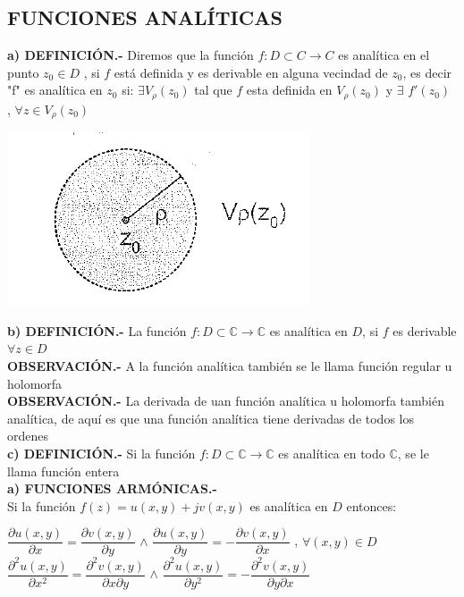 \documentclass[10pt,a4paper]{book}
\begin{document}
\subsection{FUNCIONES ANALÍTICAS}
\textbf{a) DEFINICIÓN.- } Diremos que la función $f: D\subset C \rightarrow C$ es analítica en el punto $z_0 \in D$ , si $f$ está definida y es derivable en alguna vecindad de $z_0$, es decir "f" es analítica en $z_0$ si: $\exists V_\rho (z_0)$ tal que $f$ esta definida en $V_\rho (z_0)$ y $\displaystyle \exists$ $ f'(z_0)$ , $\forall z \in V_\rho (z_0)$
\begin{center}
 \includegraphics[scale=0.7]{analiticas.png}
\end{center}
\textbf{b) DEFINICIÓN.- } La función $f:D\subset \mathbb{C} \rightarrow \mathbb{C}$ es analítica en $D$, si $f$ es derivable $\forall z \in D$ \\
\textbf{OBSERVACIÓN.- }		A la función analítica también se le llama función regular u holomorfa\\
\textbf{OBSERVACIÓN.- }		La derivada de uan función analítica u holomorfa también analítica, de aquí es que una función analítica tiene derivadas de todos los ordenes\\
\textbf{c) DEFINICIÓN.- } Si la función $f:D\subset \mathbb{C} \rightarrow \mathbb{C}$ es analítica en todo $\mathbb{C}$, se le llama función entera \\
\textbf{a) FUNCIONES ARMÓNICAS.- }   \\
Si la función $f(z)=u(x,y) +jv(x,y)$ es analítica en $D$ entonces:
\begin{center}
 $\dfrac{\partial u(x,y)}{\partial x} = \dfrac{\partial v(x,y)}{\partial y} $	$\wedge$	$\dfrac{\partial u(x,y)} {\partial y} = -\dfrac{\partial v(x,y)}{\partial x}$ , $\forall (x,y) \in D$ \\
 $\dfrac{\partial^2 u(x,y)}{\partial x^2} = \dfrac{\partial^2 v(x,y)}{\partial x \partial y} $	$\wedge$	$\dfrac{\partial^2 u(x,y)}{\partial y^2} = -\dfrac{\partial^2 v(x,y)}{\partial y \partial x}$
\end{center}
\end{document}
